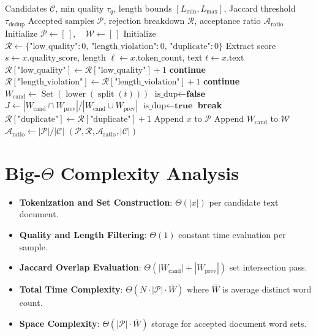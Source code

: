 \documentclass[11pt,a4paper]{article}
\theoremstyle{definition}
\begin{document}
\begin{algorithm}[H]
\caption{Synthetic Data Quality Filtering and Deduplication}
\begin{algorithmic}[1]
\Require Candidates $\mathcal{C}$, min quality $\tau_q$, length bounds $[L_{\min}, L_{\max}]$, Jaccard threshold $\tau_{\text{dedup}}$
\Ensure Accepted samples $\mathcal{P}$, rejection breakdown $\mathcal{R}$, acceptance ratio $\mathcal{A}_{\text{ratio}}$
\State Initialize $\mathcal{P} \gets [\,], \quad \mathcal{W} \gets [\,]$
\State Initialize $\mathcal{R} \gets \{ \text{"low\_quality"}: 0, \, \text{"length\_violation"}: 0, \, \text{"duplicate"}: 0 \}$
    \State Extract score $s \gets x.\text{quality\_score}$, length $\ell \gets x.\text{token\_count}$, text $t \gets x.\text{text}$
        \State $\mathcal{R}[\text{"low\_quality"}] \gets \mathcal{R}[\text{"low\_quality"}] + 1$
        \State \textbf{continue}
    \EndIf
        \State $\mathcal{R}[\text{"length\_violation"}] \gets \mathcal{R}[\text{"length\_violation"}] + 1$
        \State \textbf{continue}
    \EndIf
    \State $W_{\text{cand}} \gets \operatorname{Set}(\operatorname{lower}(\operatorname{split}(t)))$
    \State $\text{is\_dup} \gets \textbf{false}$
        \State $J \gets |W_{\text{cand}} \cap W_{\text{prev}}| / |W_{\text{cand}} \cup W_{\text{prev}}|$
            \State $\text{is\_dup} \gets \textbf{true}$
            \State \textbf{break}
        \EndIf
    \EndFor
        \State $\mathcal{R}[\text{"duplicate"}] \gets \mathcal{R}[\text{"duplicate"}] + 1$
    \Else
        \State Append $x$ to $\mathcal{P}$
        \State Append $W_{\text{cand}}$ to $\mathcal{W}$
    \EndIf
\EndFor
\State $\mathcal{A}_{\text{ratio}} \gets |\mathcal{P}| / |\mathcal{C}|$
\State \Return $(\mathcal{P}, \mathcal{R}, \mathcal{A}_{\text{ratio}}, |\mathcal{C}|)$
\end{algorithmic}
\end{algorithm}

\section{Big-$\Theta$ Complexity Analysis}

\begin{itemize}
    \item \textbf{Tokenization and Set Construction}: $\Theta(|x|)$ per candidate text document.
    \item \textbf{Quality and Length Filtering}: $\Theta(1)$ constant time evaluation per sample.
    \item \textbf{Jaccard Overlap Evaluation}: $\Theta(|W_{\text{cand}}| + |W_{\text{prev}}|)$ set intersection pass.
    \item \textbf{Total Time Complexity}: $\Theta(N \cdot |\mathcal{P}| \cdot \bar{W})$ where $\bar{W}$ is average distinct word count.
    \item \textbf{Space Complexity}: $\Theta(|\mathcal{P}| \cdot \bar{W})$ storage for accepted document word sets.
\end{itemize}
\end{document}
